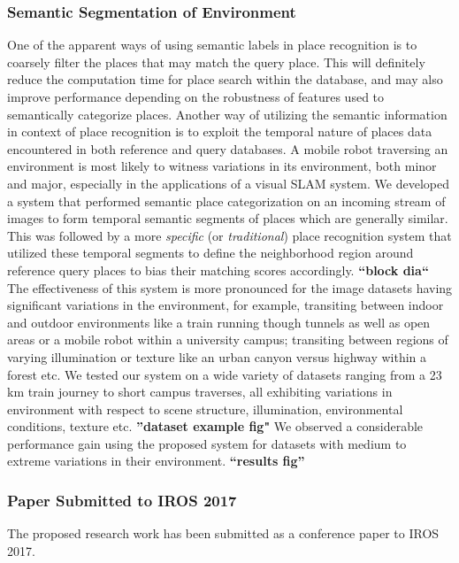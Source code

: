 \documentclass{article}
\begin{document}
\subsubsection{Semantic Segmentation of Environment}
One of the apparent ways of using semantic labels in place recognition is to coarsely filter the places that may match the query place. This will definitely reduce the computation time for place search within the database, and may also improve performance depending on the robustness of features used to semantically categorize places. Another way of utilizing the semantic information in context of place recognition is to exploit the temporal nature of places data encountered in both reference and query databases. A mobile robot traversing an environment is most likely to witness variations in its environment, both minor and major, especially in the applications of a visual SLAM system. We developed a system that performed semantic place categorization on an incoming stream of images to form temporal semantic segments of places which are generally similar. This was followed by a more \emph{specific} (or \emph{traditional}) place recognition system that utilized these temporal segments to define the neighborhood region around reference query places to bias their matching scores accordingly. \textbf{``block dia``} The effectiveness of this system is more pronounced for the image datasets having significant variations in the environment, for example, transiting between indoor and outdoor environments like a train running though tunnels as well as open areas or a mobile robot within a university campus; transiting between regions of varying illumination or texture like an urban canyon versus highway within a forest etc. We tested our system on a wide variety of datasets ranging from a 23 km train journey to short campus traverses, all exhibiting variations in environment with respect to scene structure, illumination, environmental conditions, texture etc. \textbf{''dataset example fig"} We observed a considerable performance gain using the proposed system for datasets with medium to extreme variations in their environment. \textbf{``results fig''}

\subsubsection{Paper Submitted to IROS 2017}
The proposed research work has been submitted as a conference paper to IROS 2017.
\end{document}

